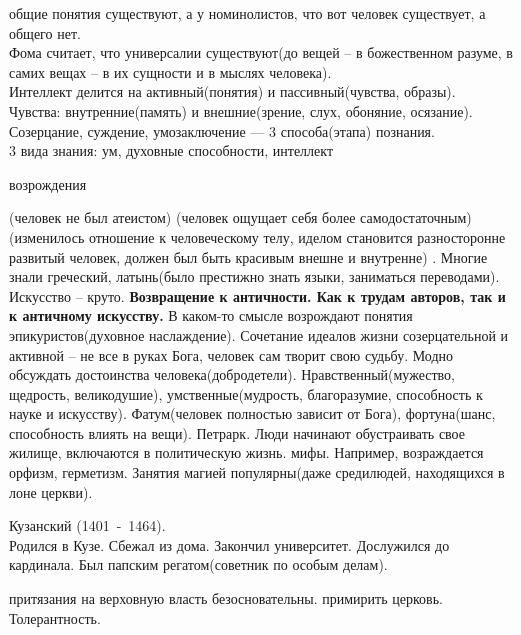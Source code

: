 \documentclass[a4paper,12pt]{report} %
\begin{document}
\begin{itemize}
\begin{enumerate}
\begin{enumerate}
      общие понятия существуют, а у номинолистов, что вот человек
      существует, а общего нет.
      \\Фома считает, что универсалии существуют(до вещей -- в божественном
      разуме, в самих вещах -- в их сущности и в мыслях человека).
      \\Интеллект делится на активный(понятия) и пассивный(чувства,
      образы).
      \\Чувства: внутренние(память) и внешние(зрение, слух, обоняние,
      осязание).
      \\Созерцание, суждение, умозаключение --- 3 способа(этапа) познания.
      \\3 вида знания: ум, духовные способности, интеллект
    \end{enumerate}
  \end{enumerate}
 возрождения
  \begin{itemize}
  (человек не был атеистом)
  (человек ощущает себя более самодостаточным) 
  (изменилось отношение к
    человеческому телу, иделом становится разносторонне развитый человек,
    должен был быть красивым внешне и внутренне)
  . Многие знали греческий, латынь(было престижно знать
    языки, заниматься переводами). Искусство -- круто. \textbf{Возвращение к
      античности. Как к трудам авторов, так и к античному искусству.} В
    каком-то смысле возрождают понятия эпикуристов(духовное
    наслаждение). Сочетание идеалов жизни созерцательной и активной --
    не все в руках Бога, человек сам творит свою судьбу. Модно обсуждать
    достоинства человека(добродетели). Нравственный(мужество, щедрость,
    великодушие), умственные(мудрость, благоразумие, способность к науке
    и искусству). Фатум(человек полностью зависит от Бога),
    фортуна(шанс, способность влиять на вещи). Петрарк. Люди начинают
    обустраивать свое жилище, включаются в политическую жизнь.
   мифы. Например, возраждается орфизм,
    герметизм. Занятия магией популярны(даже средилюдей, находящихся в
    лоне церкви).
  \end{itemize}
  \begin{enumerate}
   Кузанский (1401~-~1464).\\
    Родился в Кузе. Сбежал из
    дома. Закончил университет. Дослужился до кардинала. Был папским
    регатом(советник по особым делам).
    \begin{enumerate}
     притязания на верховную власть безосновательны.
     примирить церковь. Толерантность.

\end{enumerate}
\end{enumerate}
\end{itemize}
\end{document}

